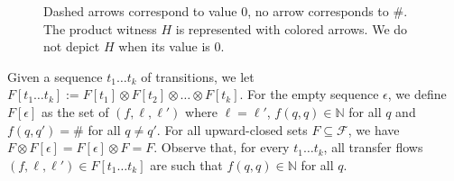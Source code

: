 \documentclass[10pt,a4paper]{article}
\let\mathbb\mathds
\newcommand{\nats}{\mathbb{N}}
\newcommand{\deff}{:=}
\newcommand*{\atrans}{t}
\newcommand*{\abuchistate}{\ell}
\newcommand*{\bstate}{\abuchistate}
\newcommand*{\dummysymb}{\#}
\newcommand*{\transferflows}{\mathcal{F}}
\newcommand*{\transfersof}[1]{F[#1]}
\newcommand*{\tftimes}{\otimes}
\newcommand*{\emptysequence}{\epsilon}
\begin{document}
\begin{figure}
{
	}
	\caption{%
		Dashed arrows correspond to value \(0\), no arrow corresponds to \(\dummysymb\).
		The product witness \(H\) is represented with colored arrows.
		We do not depict \(H\) when its value is \(0\).
	}\label{fig:example-composition}
\end{figure}

Given a sequence \(\atrans_1 \dots \atrans_k\) of transitions, we let \(\transfersof{\atrans_1 \dots \atrans_k} \deff \transfersof{\atrans_1} \tftimes \transfersof{\atrans_2} \tftimes \dots \tftimes \transfersof{\atrans_k}\).
For the empty sequence \(\emptysequence\), we define \(\transfersof{\emptysequence}\) as the set of \((f,\bstate,\bstate')\) where \(\bstate = \bstate'\), \(f(q,q) \in \nats\) for all \(q\) and \(f(q,q') = \dummysymb\) for all \(q \ne q'\).
For all upward-closed sets \(F \subseteq \transferflows\), we have \(F \tftimes \transfersof{\emptysequence} = \transfersof{\emptysequence} \tftimes F = F\).
Observe that, for every \(\atrans_1 \dots \atrans_k\), all transfer flows \((f, \bstate, \bstate') \in \transfersof{\atrans_1 \dots \atrans_k}\) are such that \(f(q,q) \in \nats\) for all \(q\).
\end{document}
